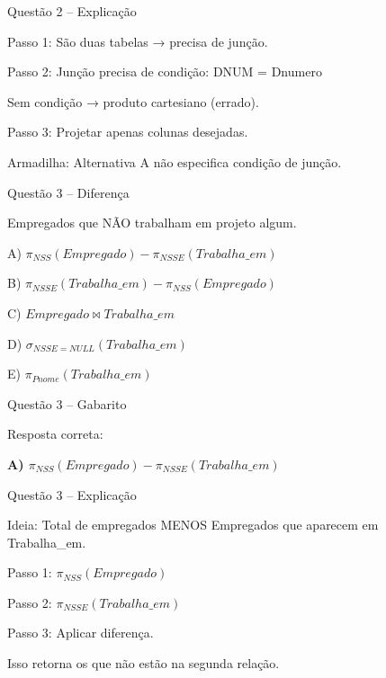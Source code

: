 \documentclass{beamer}
\begin{document}
\begin{frame}{Questão 2 – Explicação}

Passo 1: São duas tabelas → precisa de junção.

Passo 2: Junção precisa de condição:
DNUM = Dnumero

Sem condição → produto cartesiano (errado).

Passo 3: Projetar apenas colunas desejadas.

Armadilha:
Alternativa A não especifica condição de junção.

\end{frame}







\begin{frame}{Questão 3 – Diferença}

Empregados que NÃO trabalham em projeto algum.

A) $\pi_{NSS}(Empregado) - \pi_{NSSE}(Trabalha\_em)$

B) $\pi_{NSSE}(Trabalha\_em) - \pi_{NSS}(Empregado)$

C) $Empregado \Join Trabalha\_em$

D) $\sigma_{NSSE=NULL}(Trabalha\_em)$

E) $\pi_{Pnome}(Trabalha\_em)$

\end{frame}





\begin{frame}{Questão 3 – Gabarito}

Resposta correta:

\Large \textbf{A) $\pi_{NSS}(Empregado) - \pi_{NSSE}(Trabalha\_em)$}

\end{frame}





\begin{frame}{Questão 3 – Explicação}

Ideia:
Total de empregados
MENOS
Empregados que aparecem em Trabalha_em.

Passo 1:
$\pi_{NSS}(Empregado)$

Passo 2:
$\pi_{NSSE}(Trabalha\_em)$

Passo 3:
Aplicar diferença.

Isso retorna os que não estão na segunda relação.

\end{frame}
\end{document}
